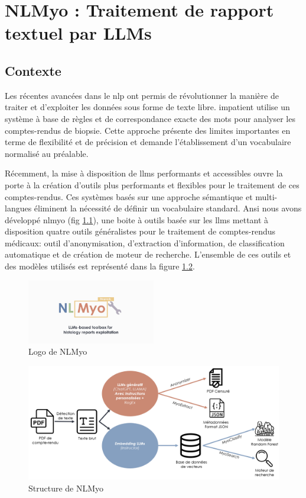 \chapter{NLMyo : Traitement de rapport textuel par LLMs}

\section{Contexte}
Les récentes avancées dans le \gls{nlp} ont permis de révolutionner la manière de traiter et d'exploiter les données sous forme de texte libre. \gls{impatient} utilise un système à base de règles et de correspondance exacte des mots pour analyser les comptes-rendus de biopsie. Cette approche présente des limites importantes en terme de flexibilité et de précision et demande l'établissement d'un vocabulaire normalisé au préalable. 

Récemment, la mise à disposition de \gls{llms} performants et accessibles ouvre la porte à la création d'outils plus performants et flexibles pour le traitement de ces comptes-rendus. Ces systèmes basés sur une approche sémantique et multi-langues éliminent la nécessité de définir un vocabulaire standard. Ansi nous avons développé \gls{nlmyo} (fig \ref{fig:nlmyo_logo}), une boite à outils basée sur les \gls{llms} mettant à disposition quatre outils généralistes pour le traitement de comptes-rendus médicaux: outil d'anonymisation, d'extraction d'information, de classification automatique et de création de moteur de recherche. L'ensemble de ces outils et des modèles utilisés est représenté dans la figure \ref{fig:nlmyo_struct}.
\begin{figure}[!ht]
 \centering
 \includegraphics[width=0.5\textwidth]{figures/nlmyo_banner.png}
 \caption[Logo NLMyo]{Logo de NLMyo}
 \label{fig:nlmyo_logo}
\end{figure}
\begin{figure}[!ht]
 \centering
 \includegraphics[width=1\textwidth]{figures/nlmyo_struct.png}
 \caption[Structure de NLMyo]{Structure de NLMyo}
 \label{fig:nlmyo_struct}
\end{figure}
